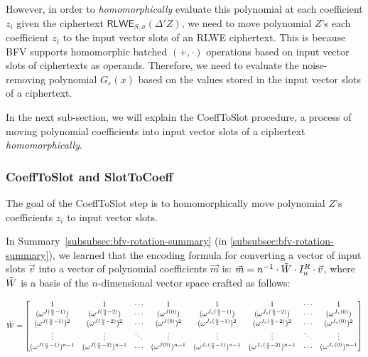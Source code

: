 

However, in order to \textit{homomorphically} evaluate this polynomial at each coefficient $z_i$ given the ciphertext $\textsf{RLWE}_{S, \sigma}(\Delta' Z)$, we need to move polynomial $Z$'s each coefficient $z_i$ to the input vector slots of an RLWE ciphertext. This is because BFV supports homomorphic batched $(+, \cdot)$ operations based on input vector slots of ciphertexts as operands. Therefore, we need to evaluate the noise-removing polynomial $G_\varepsilon(x)$ based on the values stored in the input vector slots of a ciphertext. 

In the next sub-section, we will explain the \textsf{CoeffToSlot} procedure, a process of moving polynomial coefficients into input vector slots of a ciphertext \textit{homomorphically}. 

\subsubsection{\textsf{CoeffToSlot} and \textsf{SlotToCoeff}}
\label{subsubsec:bfv-bootstrapping-coefftoslot}

The goal of the \textsf{CoeffToSlot} step is to homomorphically move polynomial $Z$'s coefficients $z_i$ to input vector slots. 


In Summary~\ref*{subsubsec:bfv-rotation-summary} (in \autoref{subsubsec:bfv-rotation-summary}), we learned that the encoding formula for converting a vector of input slots $\vec{v}$ into a vector of polynomial coefficients $\vec{m}$ is: $\vec{m} = n^{-1}\cdot\tilde{W} \cdot I_n^R \cdot \vec{v}$, where $\tilde{W}$ is a basis of the $n$-dimensional vector space crafted as follows: 

$\tilde{W} = \begin{bmatrix}
1 & 1 & \cdots & 1 & 1 & 1 & \cdots & 1\\
(\omega^{J(\frac{n}{2} - 1)}) & (\omega^{J(\frac{n}{2} - 2)}) & \cdots & (\omega^{J(0)}) & (\omega^{J_*(\frac{n}{2} - 1)}) & (\omega^{J_*(\frac{n}{2} - 2)}) & \cdots & (\omega^{J_*(0)})\\
(\omega^{J(\frac{n}{2} - 1)})^2 & (\omega^{J(\frac{n}{2} - 2)})^2 & \cdots & (\omega^{J(0)})^2 & (\omega^{J_*(\frac{n}{2} - 1)})^2 & (\omega^{J_*(\frac{n}{2} - 2)})^2 & \cdots & (\omega^{J_*(0)})^2 \\
\vdots & \vdots & \ddots & \vdots & \vdots & \vdots & \ddots & \vdots \\
(\omega^{J(\frac{n}{2} - 1)})^{n-1} & (\omega^{J(\frac{n}{2} - 2)})^{n-1} & \cdots & (\omega^{J(0)})^{n-1} & (\omega^{J_*(\frac{n}{2} - 1)})^{n-1} & (\omega^{J_*(\frac{n}{2} - 2)})^{n-1} & \cdots  & (\omega^{J_*(0)})^{n-1}
\end{bmatrix}$

